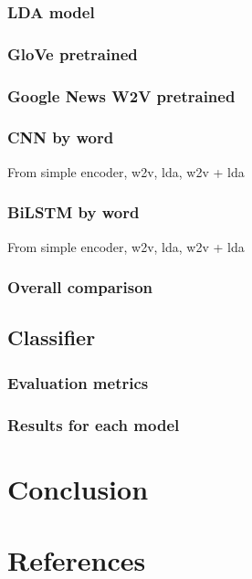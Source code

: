 \documentclass[11pt]{article}
\begin{document}
\subsubsection{LDA model}


\subsubsection{GloVe pretrained}

\subsubsection{Google News W2V pretrained}

\subsubsection{CNN by word}

From simple encoder, w2v, lda, w2v + lda

\subsubsection{BiLSTM by word}

From simple encoder, w2v, lda, w2v + lda

\subsubsection{Overall comparison}

\subsection{Classifier}
\subsubsection{Evaluation metrics}
\subsubsection{Results for each model}


\section{Conclusion}


\section{References}


\end{document}
